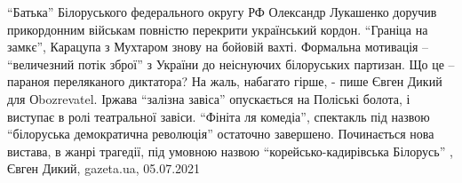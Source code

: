\enquote{Батька} Білоруського федерального округу РФ Олександр Лукашенко
доручив прикордонним військам повністю перекрити український кордон.
\enquote{Граніца на замкє}, Карацупа з Мухтаром знову на бойовій вахті.
Формальна мотивація – \enquote{величезний потік зброї} з України до неіснуючих
білоруських партизан. Що це – параноя переляканого диктатора? На жаль, набагато
гірше, - пише Євген Дикий для Оbozrevatel.  Іржава \enquote{залізна завіса}
опускається на Поліські болота, і виступає в ролі театральної завіси.
\enquote{Фініта ля комедіа}, спектакль під назвою \enquote{білоруська
демократична революція} остаточно завершено. Починається нова вистава, в жанрі
трагедії, під умовною назвою \enquote{корейсько-кадирівська Білорусь}
, 
Євген Дикий, gazeta.ua, 05.07.2021
